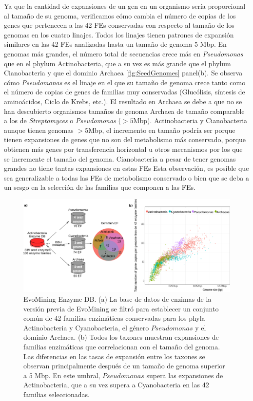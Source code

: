 \documentclass[12pt,twoside]{reedthesis}
\begin{document}
  Ya que la cantidad de expansiones de un gen en un organismo sería
  proporcional al tamaño de su genoma, verificamos cómo cambia el número
  de copias de los genes que pertenecen a las 42 FEs conservadas con
  respecto al tamaño de los genomas en los cuatro linajes. Todos los
  linajes tienen patrones de expansión similares en las 42 FEs analizadas
  hasta un tamaño de genoma 5 Mbp. En genomas más grandes, el número total
  de secuencias crece más en \emph{Pseudomonas} que en el phylum
  Actinobacteria, que a su vez es más grande que el phylum Cianobacteria y
  que el dominio Archaea \autoref{fig:SeedGenomes} panel(b). Se observa
  cómo \emph{Pseudomonas} es el linaje en el que su tamaño de genoma crece
  tanto como el número de copias de genes de familias muy conservadas
  (Glucólisis, síntesis de aminoácidos, Ciclo de Krebs, etc.). El
  resultado en Archaea se debe a que no se han descubierto organismos
  tamaños de genoma Archaea de tamaño comparable a los de
  \emph{Streptomyces} o \emph{Pseudomonas} (\(> 5\)Mbp). Actinobacteria y
  Cianobacteria aunque tienen genomas \(>5\)Mbp, el incremento en tamaño
  podría ser porque tienen expansiones de genes que no son del metabolismo
  más conservado, porque obtienen más genes por transferencia horizontal u
  otros mecanismos por los que se incremente el tamaño del genoma.
  Cianobacteria a pesar de tener genomas grandes no tiene tantas
  expansiones en estas FEs Esta observación, es posible que sea
  generalizable a todas las FEs de metabolismo conservado o bien que se
  deba a un sesgo en la selección de las familias que componen a las FEs.
  
  \begin{figure}[h!tbp]
  \centering
  \includegraphics[angle = 0,scale = .6]{chapter2/FigurasPaper/Figure2.pdf}
  \caption[Contrucción de la base de datos Enzyme DB de enzimas semilla.]{\footnotesize{ EvoMining Enzyme DB. (a) La base de datos de enzimas de la versión previa de EvoMining se filtró para establecer un conjunto común de 42 familias enzimáticas conservadas para los phyla Actinobacteria y Cyanobacteria, el género $Pseudomonas$ y el dominio Archaea. (b) Todos los taxones muestran expansiones de familias enzimáticas que correlacionan con el tamaño del genoma. Las diferencias en las tasas de expansión entre los taxones se observan principalmente después de un tamaño de genoma superior a 5 Mbp. En este umbral, $Pseudomonas$ supera las expansiones de Actinobacteria, que a su vez supera a Cyanobacteria en las 42 familias seleccionadas.}}
  \label{fig:SeedGenomes}
  \end{figure}
  
\end{document}
